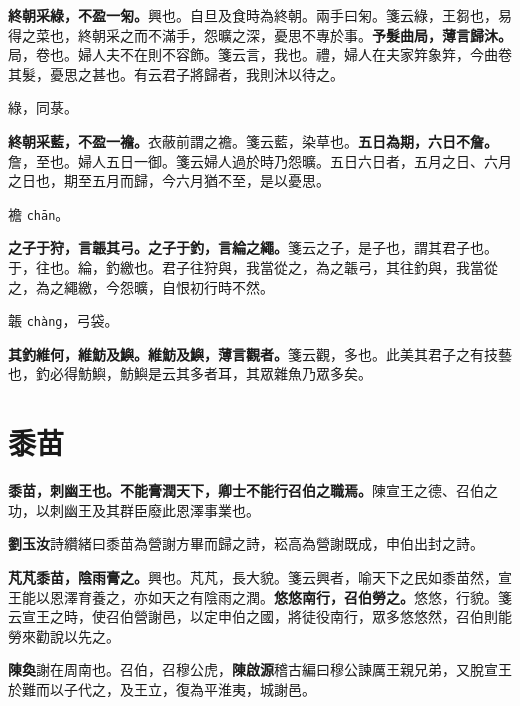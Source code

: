 \textbf{終朝采綠，不盈一匊。}{\footnotesize 興也。自旦及食時為終朝。兩手曰匊。箋云綠，王芻也，易得之菜也，終朝采之而不滿手，怨曠之深，憂思不專於事。}\textbf{予髮曲局，薄言歸沐。}{\footnotesize 局，卷也。婦人夫不在則不容飾。箋云言，我也。禮，婦人在夫家筓象筓，今曲卷其髮，憂思之甚也。有云君子將歸者，我則沐以待之。}

\begin{quoting}綠，同菉。\end{quoting}

\textbf{終朝采藍，不盈一襜。}{\footnotesize 衣蔽前謂之襜。箋云藍，染草也。}\textbf{五日為期，六日不詹。}{\footnotesize 詹，至也。婦人五日一御。箋云婦人過於時乃怨曠。五日六日者，五月之日、六月之日也，期至五月而歸，今六月猶不至，是以憂思。}

\begin{quoting}襜 \texttt{chān}。\end{quoting}

\textbf{之子于狩，言韔其弓。之子于釣，言綸之繩。}{\footnotesize 箋云之子，是子也，謂其君子也。于，往也。綸，釣繳也。君子往狩與，我當從之，為之韔弓，其往釣與，我當從之，為之繩繳，今怨曠，自恨初行時不然。}

\begin{quoting}韔 \texttt{chàng}，弓袋。\end{quoting}

\textbf{其釣維何，維魴及鱮。維魴及鱮，薄言觀者。}{\footnotesize 箋云觀，多也。此美其君子之有技藝也，釣必得魴鱮，魴鱮是云其多者耳，其眾雜魚乃眾多矣。}

\section{黍苗}


\textbf{黍苗，刺幽王也。不能膏潤天下，卿士不能行召伯之職焉。}{\footnotesize 陳宣王之德、召伯之功，以刺幽王及其群臣廢此恩澤事業也。}

\begin{quoting}\textbf{劉玉汝}詩纘緒曰黍苗為營謝方畢而歸之詩，崧高為營謝既成，申伯出封之詩。\end{quoting}

\textbf{芃芃黍苗，陰雨膏之。}{\footnotesize 興也。芃芃，長大貌。箋云興者，喻天下之民如黍苗然，宣王能以恩澤育養之，亦如天之有陰雨之潤。}\textbf{悠悠南行，召伯勞之。}{\footnotesize 悠悠，行貌。箋云宣王之時，使召伯營謝邑，以定申伯之國，將徒役南行，眾多悠悠然，召伯則能勞來勸說以先之。}

\begin{quoting}\textbf{陳奐}謝在周南也。召伯，召穆公虎，\textbf{陳啟源}稽古編曰穆公諫厲王親兄弟，又脫宣王於難而以子代之，及王立，復為平淮夷，城謝邑。\end{quoting}

